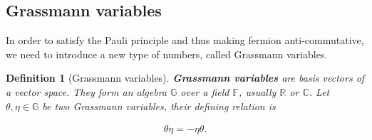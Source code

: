 \documentclass{article}
\theoremstyle{plain} %
\newtheorem{definition}{Definition}[section]
\theoremstyle{convention} %
\theoremstyle{remark} %
\def\df#1{\textbf{\textit{#1}}}
\numberwithin{equation}{section}
\begin{document}
\begin{appendix}

\subsection{Grassmann variables}

\label{sec:grassmann}

In order to satisfy the Pauli principle and thus making fermion anti-commutative, we need to introduce a new type of numbers, called Grassmann variables.

\begin{definition}[Grassmann variables]

\df{Grassmann variables} are basis vectors of a vector space. They form an algebra $\mathbb{G}$ over a field $\mathbb{F}$, usually $\mathbb{R}$ or $\mathbb{C}$. Let $\theta, \eta \in \mathbb{G}$ be two Grassmann variables, their defining relation is

\begin{align*}
    \theta \eta = - \eta \theta.
\end{align*}


\end{definition}
\end{appendix}
\end{document}
